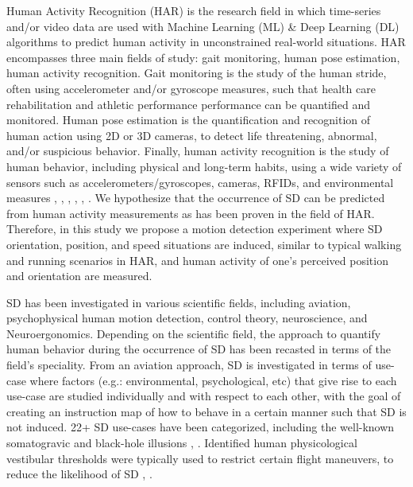 \documentclass{ieeeaccess}
\begin{document}
Human Activity Recognition (HAR) is the research field in which time-series and/or video data are used with Machine Learning (ML) \& Deep Learning (DL) algorithms to predict human activity in unconstrained real-world situations. HAR encompasses three main fields of study: gait monitoring, human pose estimation, human activity recognition. Gait monitoring is the study of the human stride, often using accelerometer and/or gyroscope measures, such that health care rehabilitation and athletic performance performance can be quantified and monitored. Human pose estimation is the quantification and recognition of human action using 2D or 3D cameras, to detect life threatening, abnormal, and/or suspicious behavior. Finally, human activity recognition is the study of human behavior, including physical and long-term habits, using a wide variety of sensors such as accelerometers/gyroscopes, cameras, RFIDs, and environmental measures \cite{Anguita_2012_SVMHumanActivity}, \cite{Dirgova_2022_Wearable}, \cite{Fu_2020_Sensing}, \cite{Von_2017_Sparse}, \cite{Nedorubova_2021_CWT_CNN_HumanActivity}, \cite{An_2021_Mgait} \cite{Xiao_2003_DeepLearning}. We hypothesize that the occurrence of SD can be predicted from human activity measurements as has been proven in the field of HAR. Therefore, in this study we propose a motion detection experiment where SD orientation, position, and speed situations are induced, similar to typical walking and running scenarios in HAR, and human activity of one's perceived position and orientation are measured.

SD has been investigated in various scientific fields, including aviation, psychophysical human motion detection, control theory, neuroscience, and Neuroergonomics. Depending on the scientific field, the approach to quantify human behavior during the occurrence of SD has been recasted in terms of the field's speciality. From an aviation approach, SD is investigated in terms of use-case where factors (e.g.: environmental, psychological, etc) that give rise to each use-case are studied individually and with respect to each other, with the goal of creating an instruction map of how to behave in a certain manner such that SD is not induced. 22+ SD use-cases have been categorized, including the well-known somatogravic and black-hole illusions \cite{Newman_2007_SD}, \cite{Gillingham_1993_Spatial}.  Identified human physicological vestibular thresholds were typically used to restrict certain flight maneuvers, to reduce the likelihood of SD \cite{Gillingham_1993_Spatial}, \cite{Previc_2004_Spatial}. 
\end{document}
